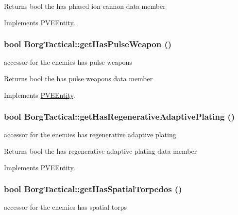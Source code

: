 \begin{DoxyReturn}{Returns}
bool the has phased ion cannon data member 
\end{DoxyReturn}


Implements \hyperlink{classPVEEntity}{PVEEntity}.

\hypertarget{classBorgTactical_af5ccad2e38ebe5fded20b3a455bb88ce}{
\subsubsection[{getHasPulseWeapon}]{\setlength{\rightskip}{0pt plus 5cm}bool BorgTactical::getHasPulseWeapon ()}}
\label{d0/d4e/classBorgTactical_af5ccad2e38ebe5fded20b3a455bb88ce}
accessor for the enemies has pulse weapons

\begin{DoxyReturn}{Returns}
bool the has pulse weapons data member 
\end{DoxyReturn}


Implements \hyperlink{classPVEEntity}{PVEEntity}.

\hypertarget{classBorgTactical_ade29b0b43b95245653b98f2c0404e782}{
\subsubsection[{getHasRegenerativeAdaptivePlating}]{\setlength{\rightskip}{0pt plus 5cm}bool BorgTactical::getHasRegenerativeAdaptivePlating ()}}
\label{d0/d4e/classBorgTactical_ade29b0b43b95245653b98f2c0404e782}
accessor for the enemies has regenerative adaptive plating

\begin{DoxyReturn}{Returns}
bool the has regenerative adaptive plating data member 
\end{DoxyReturn}


Implements \hyperlink{classPVEEntity}{PVEEntity}.

\hypertarget{classBorgTactical_a3bdb9af44e6b4e0f82786ea56ffb4886}{
\subsubsection[{getHasSpatialTorpedos}]{\setlength{\rightskip}{0pt plus 5cm}bool BorgTactical::getHasSpatialTorpedos ()}}
\label{d0/d4e/classBorgTactical_a3bdb9af44e6b4e0f82786ea56ffb4886}
accessor for the enemies has spatial torps

